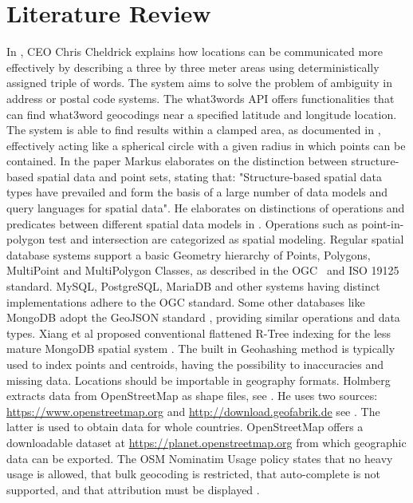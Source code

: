 %
\section{Literature Review}
In \cite{w3w}, CEO Chris Cheldrick explains how locations can be communicated more effectively by describing a three by three meter areas using deterministically assigned triple of words. The system aims to solve the problem of ambiguity in address or postal code systems. The what3words API offers functionalities that can find what3word geocodings near a specified latitude and longitude location. The system is able to find results within a clamped area, as documented in \cite{w3w-api}, effectively acting like a spherical circle with a given radius in which points can be contained. In the paper \cite{spatial-data-types} Markus elaborates on the distinction between structure-based spatial data and point sets, stating that: "Structure-based spatial data types have prevailed and form the basis of a large number of data models and query languages for spatial data". He elaborates on distinctions of operations and predicates between different spatial data models in \cite{geometry}. Operations such as point-in-polygon test and intersection are categorized as spatial modeling. Regular spatial database systems support a basic Geometry hierarchy of Points, Polygons, MultiPoint and MultiPolygon Classes, as described in the OGC~\cite{SFA} and ISO 19125~\cite{ISO-19125} standard. MySQL, PostgreSQL, MariaDB and other systems having distinct implementations adhere to the OGC standard. Some other databases like MongoDB adopt the GeoJSON standard \cite{MongoDB-GeoJSON}, providing similar operations and data types. Xiang et al proposed conventional flattened R-Tree indexing for the less mature MongoDB spatial system \cite{MongoDB-implementation}. The built in Geohashing method is typically used to index points and centroids, having the possibility to inaccuracies and missing data. Locations should be importable in geography formats. Holmberg extracts data from OpenStreetMap as shape files, see \cite[Chapter~6]{openstreetmap}. He uses two sources: \url{https://www.openstreetmap.org} and \url{http://download.geofabrik.de} see \cite[Chapter~7.3]{openstreetmap}. The latter is used to obtain data for whole countries. OpenStreetMap offers a downloadable dataset at \url{https://planet.openstreetmap.org} from which geographic data can be exported.
The OSM Nominatim Usage policy states that no heavy usage is allowed, that bulk geocoding is restricted, that auto-complete is not supported, and that attribution must be displayed \cite{OSM-policy}.

